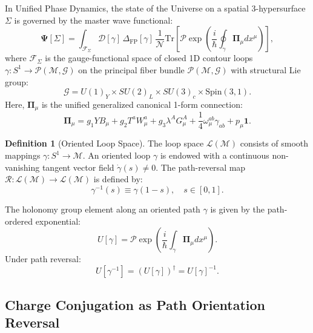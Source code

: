\documentclass[11pt,a4paper]{article}
\theoremstyle{definition}
\newtheorem{definition}[theorem]{Definition}
\begin{document}
In Unified Phase Dynamics, the state of the Universe on a spatial 3-hypersurface $\Sigma$ is governed by the master wave functional:
\begin{equation}
    \mathbf{\Psi}[\Sigma] = \int_{\mathcal{F}_\Sigma} \mathcal{D}[\gamma] \, \Delta_{\mathrm{FP}}[\gamma] \, \frac{1}{\mathcal{N}} \mathrm{Tr}\left[ \mathcal{P}\exp\left( \frac{i}{\hbar} \oint_{\gamma} \mathbf{\Pi}_\mu dx^\mu \right) \right],
    \label{eq:master_functional}
\end{equation}
where $\mathcal{F}_\Sigma$ is the gauge-functional space of closed 1D contour loops $\gamma: S^1 \to \mathcal{P}(\mathcal{M}, \mathcal{G})$ on the principal fiber bundle $\mathcal{P}(\mathcal{M}, \mathcal{G})$ with structural Lie group:
\begin{equation}
    \mathcal{G} = U(1)_Y \times SU(2)_L \times SU(3)_c \times \mathrm{Spin}(3,1).
\end{equation}
Here, $\mathbf{\Pi}_\mu$ is the unified generalized canonical 1-form connection:
\begin{equation}
    \mathbf{\Pi}_\mu = g_1 Y B_\mu + g_2 T^a W_\mu^a + g_3 \lambda^A G_\mu^A + \frac{1}{4} \omega_\mu^{ab} \gamma_{ab} + p_\mu \mathbf{1}.
\end{equation}

\begin{definition}[Oriented Loop Space]
The loop space $\mathcal{L}(\mathcal{M})$ consists of smooth mappings $\gamma: S^1 \to \mathcal{M}$. An oriented loop $\gamma$ is endowed with a continuous non-vanishing tangent vector field $\dot{\gamma}(s) \neq 0$. The path-reversal map $\mathcal{R}: \mathcal{L}(\mathcal{M}) \to \mathcal{L}(\mathcal{M})$ is defined by:
\begin{equation}
    \gamma^{-1}(s) \equiv \gamma(1 - s), \quad s \in [0, 1].
\end{equation}
\end{definition}

The holonomy group element along an oriented path $\gamma$ is given by the path-ordered exponential:
\begin{equation}
    U[\gamma] = \mathcal{P}\exp\left( \frac{i}{\hbar} \int_\gamma \mathbf{\Pi}_\mu dx^\mu \right).
\end{equation}
Under path reversal:
\begin{equation}
    U[\gamma^{-1}] = \left( U[\gamma] \right)^\dagger = U[\gamma]^{-1}.
    \label{eq:holonomy_reversal}
\end{equation}

\subsection{Charge Conjugation as Path Orientation Reversal}
\end{document}
